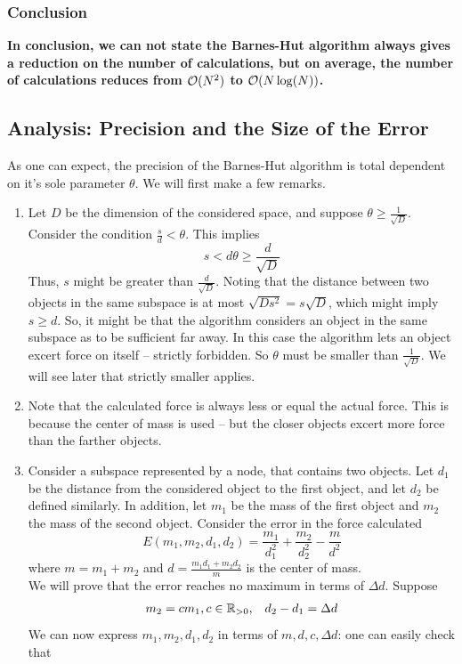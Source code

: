 \subsubsection*{Conclusion}
\textbf{In conclusion, we can not state the Barnes-Hut algorithm always gives a reduction on the number of calculations, but on average, the number of calculations reduces from $\mathcal{O}(N^2)$ to $\mathcal{O}(N\log(N))$.}
\subsection{Analysis: Precision and the Size of the Error}
As one can expect, the precision of the Barnes-Hut algorithm is total dependent on it's sole parameter $\theta$. We will first make a few remarks.
\begin{enumerate}
\item Let $D$ be the dimension of the considered space, and suppose $\theta \geq \frac{1}{\sqrt{D}}$. Consider the condition $\frac{s}{d} < \theta$. This implies
\[
s < d\theta \geq \frac{d}{\sqrt{D}}
\]
Thus, $s$ might be greater than $\frac{d}{\sqrt{D}}$. Noting that the distance between two objects in the same subspace is at most $\sqrt{Ds^2} = s\sqrt{D}$, which might imply $s\geq d$. So, it might be that the algorithm considers an object in the same subspace as to be sufficient far away. In this case the algorithm lets an object excert force on itself -- strictly forbidden. So $\theta$ must be smaller than $\frac{1}{\sqrt{D}}$. We will see later that strictly smaller applies.
\item Note that the calculated force is always less or equal the actual force. This is because the center of mass is used -- but the closer objects excert more force than the farther objects.
\item Consider a subspace represented by a node, that contains two objects. Let $d_1$ be the distance from the considered object to the first object, and let $d_2$ be defined similarly. In addition, let $m_1$ be the mass of the first object and $m_2$ the mass of the second object. Consider the error in the force calculated
\[
E(m_1,m_2,d_1,d_2) = \frac{m_1}{d_1^2}+\frac{m_2}{d_2^2}-\frac{m}{d^2}
\]
where $m = m_1+m_2$ and $d = \frac{m_1d_1+m_2d_2}{m}$ is the center of mass.\\
We will prove that the error reaches no maximum in terms of $\Delta d$. Suppose
\[
\begin{array}{cc}
m_2 = cm_1, c\in \mathbb{R}_{>0}, & d_2-d_1 = \Delta d
\end{array}
\]
We can now express $m_1,m_2,d_1,d_2$ in terms of $m,d,c,\Delta d$: one can easily check that

\end{enumerate}

